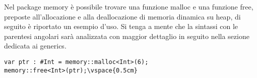 Nel package memory è possibile trovare una funzione malloc e una funzione free, preposte all’allocazione e alla deallocazione di memoria dinamica su heap, 
di seguito è riportato un esempio d’uso. Si tenga a mente che la sintassi con le parentesi angolari sarà analizzata con maggior 
dettaglio in seguito nella sezione dedicata ai generics. \\


\vspace{0.5cm}
\begin{lstlisting}[frame=single]
var ptr : #Int = memory::malloc<Int>(6);
memory::free<Int>(ptr);\vspace{0.5cm}
\end{lstlisting}
\vspace{0.5cm}